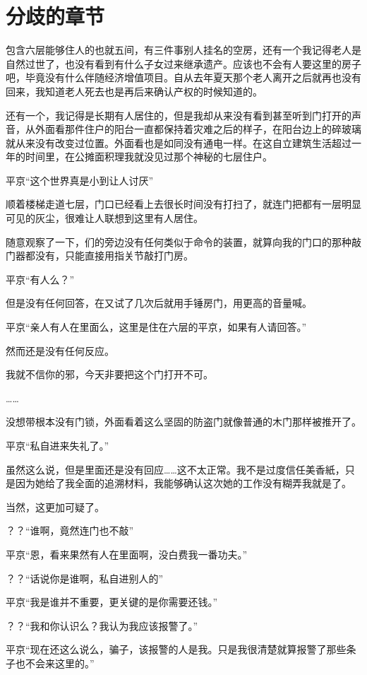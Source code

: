 \chapter[second chapter]{分歧的章节}

包含六层能够住人的也就五间，有三件事别人挂名的空房，还有一个我记得老人是自然过世了，也没有看到有什么子女过来继承遗产。应该也不会有人要这里的房子吧，毕竟没有什么伴随经济增值项目。自从去年夏天那个老人离开之后就再也没有回来，我知道老人死去也是再后来确认产权的时候知道的。

还有一个，我记得是长期有人居住的，但是我却从来没有看到甚至听到门打开的声音，从外面看那件住户的阳台一直都保持着灾难之后的样子，在阳台边上的碎玻璃就从来没有改变过位置。外面看也是如同没有通电一样。在这自立建筑生活超过一年的时间里，在公摊面积理我就没见过那个神秘的七层住户。

平京“这个世界真是小到让人讨厌”

顺着楼梯走道七层，门口已经看上去很长时间没有打扫了，就连门把都有一层明显可见的灰尘，很难让人联想到这里有人居住。

随意观察了一下，们的旁边没有任何类似于命令的装置，就算向我的门口的那种敲门器都没有，只能直接用指关节敲打门房。

平京“有人么？”

但是没有任何回答，在又试了几次后就用手锤房门，用更高的音量喊。

平京“亲人有人在里面么，这里是住在六层的平京，如果有人请回答。”

然而还是没有任何反应。

我就不信你的邪，今天非要把这个门打开不可。

……

没想带根本没有门锁，外面看着这么坚固的防盗门就像普通的木门那样被推开了。

平京“私自进来失礼了。”

虽然这么说，但是里面还是没有回应……这不太正常。我不是过度信任美香紙，只是因为她给了我全面的追溯材料，我能够确认这次她的工作没有糊弄我就是了。

当然，这更加可疑了。

？？“谁啊，竟然连门也不敲”

平京“恩，看来果然有人在里面啊，没白费我一番功夫。”

？？“话说你是谁啊，私自进别人的”

平京“我是谁并不重要，更关键的是你需要还钱。”

？？“我和你认识么？我认为我应该报警了。”

平京“现在还这么说么，骗子，该报警的人是我。只是我很清楚就算报警了那些条子也不会来这里的。”

